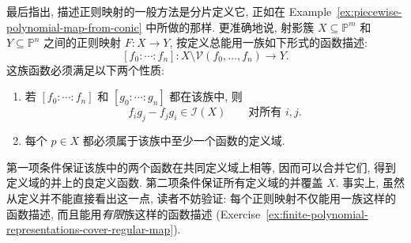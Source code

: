 最后指出, 描述正则映射的一般方法是分片定义它, 正如在 Example~\ref{ex:piecewise-polynomial-map-from-conic} 中所做的那样. 更准确地说, 射影簇 $X\subseteq\mathbb{P}^{m}$ 和 $Y\subseteq\mathbb{P}^{n}$ 之间的正则映射 $F:X\to Y$, 按定义总能用一族如下形式的函数描述:
\[
  [f_{0}:\cdots:f_{n}]:X\setminus\mathcal{V}(f_{0},\ldots,f_{n})\to Y.
\]
这族函数必须满足以下两个性质:
\begin{enumerate}[label=\arabic*.]
  \item 若 $[f_{0}:\cdots:f_{n}]$ 和 $[g_{0}:\cdots:g_{n}]$ 都在该族中, 则
  \[
    f_{i}g_{j}-f_{j}g_{i}\in\mathcal{I}(X)\qquad\text{对所有 }i,j.
  \]
  \item 每个 $p\in X$ 都必须属于该族中至少一个函数的定义域.
\end{enumerate}
第一项条件保证该族中的两个函数在共同定义域上相等, 因而可以合并它们, 得到定义域的并上的良定义函数. 第二项条件保证所有定义域的并覆盖 $X$. 事实上, 虽然从定义并不能直接看出这一点, 读者不妨验证: 每个正则映射不仅能用一族这样的函数描述, 而且能用\emph{有限}族这样的函数描述 (Exercise~\ref{ex:finite-polynomial-representations-cover-regular-map}).

